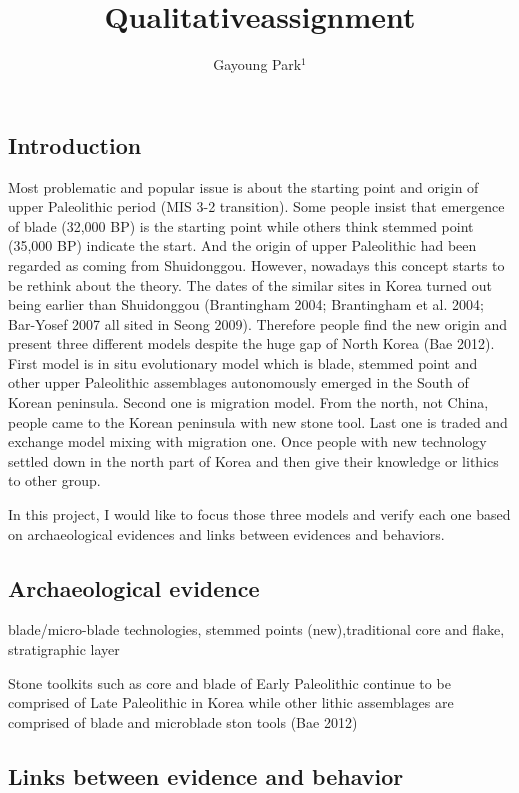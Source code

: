 \documentclass[american,man]{apa6}
\title{Qualitativeassignment}
\author{Gayoung Park\(^1\)}
\affiliation{\vspace{0.5cm}\(^1\)University of Washington}
\begin{document}
\maketitle

\subsection{Introduction}\label{introduction}

Most problematic and popular issue is about the starting point and
origin of upper Paleolithic period (MIS 3-2 transition). Some people
insist that emergence of blade (32,000 BP) is the starting point while
others think stemmed point (35,000 BP) indicate the start. And the
origin of upper Paleolithic had been regarded as coming from
Shuidonggou. However, nowadays this concept starts to be rethink about
the theory. The dates of the similar sites in Korea turned out being
earlier than Shuidonggou (Brantingham 2004; Brantingham et al. 2004;
Bar-Yosef 2007 all sited in Seong 2009). Therefore people find the new
origin and present three different models despite the huge gap of North
Korea (Bae 2012). First model is in situ evolutionary model which is
blade, stemmed point and other upper Paleolithic assemblages
autonomously emerged in the South of Korean peninsula. Second one is
migration model. From the north, not China, people came to the Korean
peninsula with new stone tool. Last one is traded and exchange model
mixing with migration one. Once people with new technology settled down
in the north part of Korea and then give their knowledge or lithics to
other group.

In this project, I would like to focus those three models and verify
each one based on archaeological evidences and links between evidences
and behaviors.

\subsection{Archaeological evidence}\label{archaeological-evidence}

blade/micro-blade technologies, stemmed points (new),traditional core
and flake, stratigraphic layer

Stone toolkits such as core and blade of Early Paleolithic continue to
be comprised of Late Paleolithic in Korea while other lithic assemblages
are comprised of blade and microblade ston tools (Bae 2012)

\subsection{Links between evidence and
behavior}\label{links-between-evidence-and-behavior}
\end{document}
